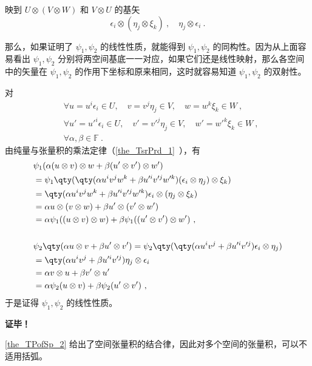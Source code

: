 映到 $U\otimes (V\otimes W)$ 和 $V\otimes U$ 的基矢 
\begin{equation}
\epsilon_i\otimes(\eta_j\otimes\xi_k)~,\quad \eta_j\otimes\epsilon_i~.
\end{equation}

那么，如果证明了 $\psi_1,\psi_2$ 的线性性质，就能得到 $\psi_1,\psi_2$ 的同构性。因为从上面容易看出 $\psi_1,\psi_2$ 分别将两空间基底一一对应，如果它们还是线性映射，那么各空间中的矢量在 $\psi_1,\psi_2$ 的作用下坐标和原来相同，这时就容易知道 $\psi_1,\psi_2$ 的双射性。

对
\begin{equation}
\begin{aligned}
&\forall u=u^i\epsilon_i\in U,\quad v=v^j\eta_j\in V,\quad w=w^k\xi_k\in W~,\\
&\forall u'=u'^i\epsilon_i\in U,\quad v'=v'^j\eta_j\in V,\quad w'=w'^k\xi_k\in W~,\\
&\forall \alpha,\beta \in\mathbb F~.
\end{aligned}
\end{equation}
由纯量与张量积的乘法定律（\autoref{the_TsrPrd_1}~），有
\begin{equation}
\begin{aligned}
&\psi_1(\alpha(u\otimes v)\otimes w+\beta(u'\otimes v')\otimes w')\\
&=\psi_1\qty(\qty(\alpha u^iv^jw^k+\beta u'^iv'^jw'^k)(\epsilon_i\otimes\eta_j)\otimes\xi_k)\\
&=\qty(\alpha u^iv^jw^k+\beta u'^iv'^jw'^k)\epsilon_i\otimes(\eta_j\otimes\xi_k)\\
&=\alpha u\otimes (v\otimes w)+\beta u'\otimes (v'\otimes w')\\
&=\alpha\psi_1((u\otimes v)\otimes w)+\beta\psi_1((u'\otimes v')\otimes w')~,\\
\\
&\psi_2\qty(\alpha u\otimes v+\beta u'\otimes v')=\psi_2\qty(\qty(\alpha u^iv^j+\beta u'^iv'^j)\epsilon_i\otimes\eta_j)\\
&=\qty(\alpha u^iv^j+\beta u'^iv'^j)\eta_j\otimes\epsilon_i\\
&=\alpha v\otimes u+\beta v'\otimes u'\\
&=\alpha\psi_2(u\otimes v)+\beta\psi_2(u'\otimes v')~,
\end{aligned}
\end{equation}
于是证得  $\psi_1,\psi_2$ 的线性性质。

\textbf{证毕！}

\autoref{the_TPofSp_2} 给出了空间张量积的结合律，因此对多个空间的张量积，可以不适用括弧。

